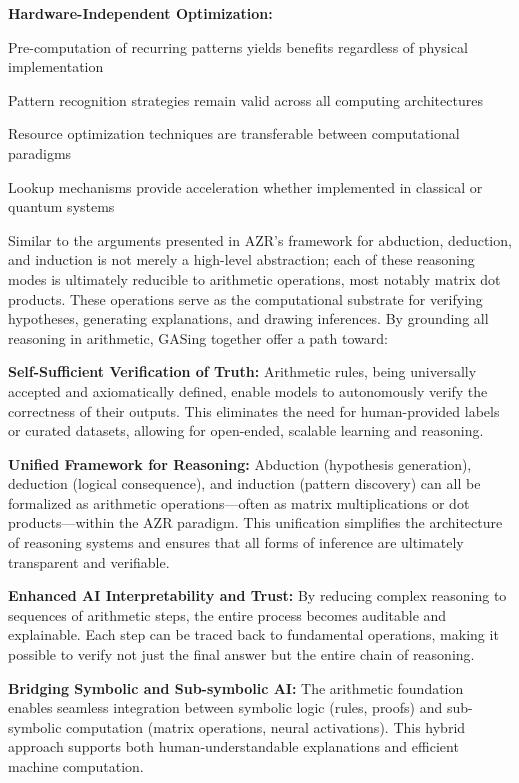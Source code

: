 \noindent\textbf{\textbf{Hardware-Independent Optimization:} }


\noindent Pre-computation of recurring patterns yields benefits regardless of physical implementation


\noindent Pattern recognition strategies remain valid across all computing architectures


\noindent Resource optimization techniques are transferable between computational paradigms


\noindent Lookup mechanisms provide acceleration whether implemented in classical or quantum systems


Similar to the arguments presented in AZR's framework for abduction, deduction, and induction is not merely a high-level abstraction; each of these reasoning modes is ultimately reducible to arithmetic operations, most notably matrix dot products. These operations serve as the computational substrate for verifying hypotheses, generating explanations, and drawing inferences. By grounding all reasoning in arithmetic, GASing together offer a path toward:


\noindent\textbf{\textbf{Self-Sufficient Verification of Truth}:} Arithmetic rules, being universally accepted and axiomatically defined, enable models to autonomously verify the correctness of their outputs. This eliminates the need for human-provided labels or curated datasets, allowing for open-ended, scalable learning and reasoning.



\noindent\textbf{\textbf{Unified Framework for Reasoning}:} Abduction (hypothesis generation), deduction (logical consequence), and induction (pattern discovery) can all be formalized as arithmetic operations—often as matrix multiplications or dot products—within the AZR paradigm. This unification simplifies the architecture of reasoning systems and ensures that all forms of inference are ultimately transparent and verifiable.



\noindent\textbf{\textbf{Enhanced AI Interpretability and Trust}:} By reducing complex reasoning to sequences of arithmetic steps, the entire process becomes auditable and explainable. Each step can be traced back to fundamental operations, making it possible to verify not just the final answer but the entire chain of reasoning.



\noindent\textbf{\textbf{Bridging Symbolic and Sub-symbolic AI}:} The arithmetic foundation enables seamless integration between symbolic logic (rules, proofs) and sub-symbolic computation (matrix operations, neural activations). This hybrid approach supports both human-understandable explanations and efficient machine computation.



